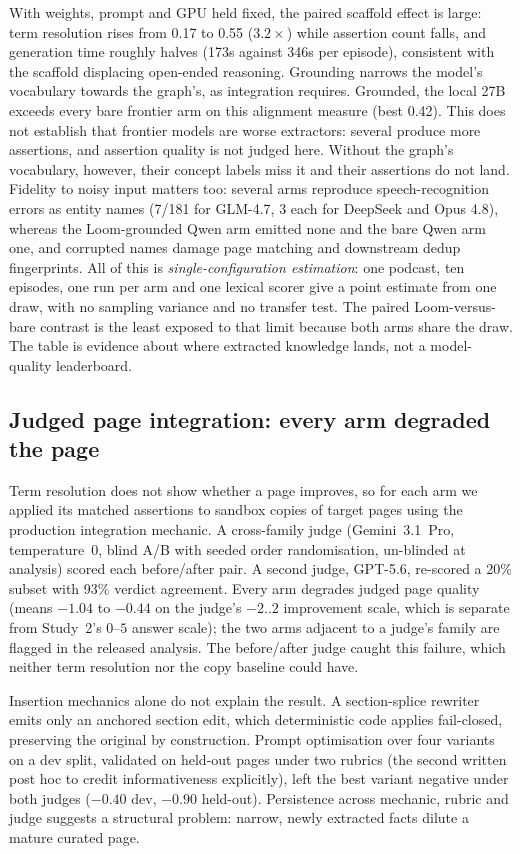 \documentclass[10pt,twocolumn]{article}
\begin{document}
With weights, prompt and GPU held fixed, the paired scaffold effect is large: term resolution rises
from 0.17 to 0.55 ($3.2\times$) while assertion count falls, and generation time roughly halves
(173s against 346s per episode), consistent with the scaffold displacing open-ended reasoning.
Grounding narrows the model's vocabulary towards the graph's, as integration requires. Grounded, the
local 27B exceeds every bare frontier arm on this alignment measure (best 0.42). This does not establish that frontier models are worse extractors: several produce more
assertions, and assertion quality is not judged here. Without the graph's vocabulary, however, their
concept labels miss it and their assertions do not land. Fidelity to noisy input matters too: several
arms reproduce speech-recognition errors as entity names (7/181 for GLM-4.7, 3 each for DeepSeek and
Opus 4.8), whereas the Loom-grounded Qwen arm emitted none and the bare Qwen arm one, and corrupted
names damage page matching and downstream dedup fingerprints. All of this is
\emph{single-configuration estimation}: one podcast, ten episodes, one run per arm and one lexical
scorer give a point estimate from one draw, with no sampling variance and no transfer test. The
paired Loom-versus-bare contrast is the least exposed to that limit because both arms share the draw.
The table is evidence about where extracted knowledge lands, not a model-quality leaderboard.

\subsection{Judged page integration: every arm degraded the page}\label{sec:pagejudge}
Term resolution does not show whether a page improves, so for each arm we applied its matched
assertions to sandbox copies of target pages using the production integration mechanic.
A cross-family judge (Gemini~3.1~Pro, temperature~0, blind A/B with seeded order randomisation,
un-blinded at analysis) scored each before/after pair. A second judge, GPT-5.6, re-scored a
20\% subset with 93\% verdict agreement. Every arm degrades judged page quality (means $-1.04$
to $-0.44$ on the judge's $-2..2$ improvement scale, which is separate from Study~2's $0$--$5$ answer
scale); the two arms adjacent to a judge's family are flagged in the released analysis. The before/after
judge caught this failure, which neither term resolution nor the copy baseline could have.

Insertion mechanics alone do not explain the result. A section-splice rewriter emits only an
anchored section edit, which deterministic code applies fail-closed, preserving the original by
construction. Prompt optimisation over four variants on a dev split, validated on held-out pages
under two rubrics (the second written post hoc to credit informativeness
explicitly), left the best variant negative under both judges ($-0.40$ dev, $-0.90$ held-out).
Persistence across mechanic, rubric and judge suggests a structural problem: narrow, newly extracted
facts dilute a mature curated page.
\end{document}
